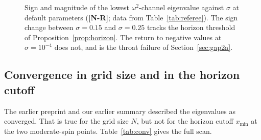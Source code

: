 \documentclass[11pt,a4paper]{article}
\newcommand{\VN}{\textcolor{vn}{\textbf{[N-R]}}}
\theoremstyle{remark}
\theoremstyle{definition}
\begin{document}
\begin{figure}[H]
\centering
{}
\caption{Sign and magnitude of the lowest $\omega^2$-channel eigenvalue against $\sigma$ at default parameters (\VN; data from Table~\ref{tab:referee}). The sign change between $\sigma = 0.15$ and $\sigma = 0.25$ tracks the horizon threshold of Proposition~\ref{prop:horizon}. The return to negative values at $\sigma = 10^{-4}$ does not, and is the throat failure of Section~\ref{sec:gap2a}.}
\label{fig:eig}
\end{figure}

\subsection{Convergence in grid size and in the horizon cutoff}

The earlier preprint and our earlier summary described the eigenvalues as converged. That is true for the grid size $N$, but not for the horizon cutoff $x_{\min}$ at the two moderate-spin points. Table~\ref{tab:conv} gives the full scan.
\end{document}
